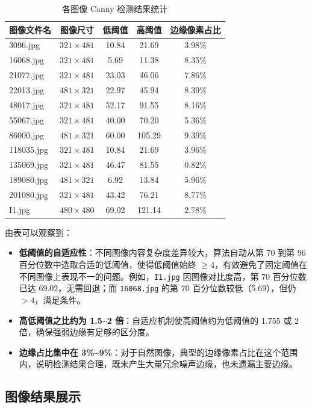 \documentclass[12pt,a4paper]{ctexart}
\begin{document}
\begin{table}[H]
\centering
\caption{各图像 Canny 检测结果统计}
\label{tab:stats}
\begin{tabular}{lcccc}
\toprule
图像文件名 & 图像尺寸 & 低阈值 & 高阈值 & 边缘像素占比 \\
\midrule
3096.jpg   & $321\times481$ & 10.84 & 21.69 & 3.98\% \\
16068.jpg  & $321\times481$ & 5.69  & 11.38 & 8.35\% \\
21077.jpg  & $321\times481$ & 23.03 & 46.06 & 7.86\% \\
22013.jpg  & $481\times321$ & 22.97 & 45.94 & 8.39\% \\
48017.jpg  & $321\times481$ & 52.17 & 91.55 & 8.16\% \\
55067.jpg  & $321\times481$ & 40.00 & 70.20 & 5.36\% \\
86000.jpg  & $481\times321$ & 60.00 & 105.29 & 9.39\% \\
118035.jpg & $321\times481$ & 10.84 & 21.69 & 3.96\% \\
135069.jpg & $321\times481$ & 46.47 & 81.55 & 0.82\% \\
189080.jpg & $481\times321$ & 6.92  & 13.84 & 5.96\% \\
201080.jpg & $321\times481$ & 43.42 & 76.21 & 8.77\% \\
I1.jpg     & $480\times480$ & 69.02 & 121.14 & 2.78\% \\
\bottomrule
\end{tabular}
\end{table}

由表可以观察到：
\begin{itemize}
  \item \textbf{低阈值的自适应性}：不同图像内容复杂度差异较大，算法自动从第 70 到第 96 百分位数中选取合适的低阈值，使得低阈值始终 $\geq 4$，有效避免了固定阈值在不同图像上表现不一的问题。例如，\texttt{I1.jpg} 因图像对比度高，第 70 百分位数已达 69.02，无需回退；而 \texttt{16068.jpg} 的第 70 百分位数较低（5.69），但仍 $> 4$，满足条件。
  \item \textbf{高低阈值之比约为 1.5--2 倍}：自适应机制使高阈值约为低阈值的 1.755 或 2 倍，确保强弱边缘有足够的区分度。
  \item \textbf{边缘占比集中在 3\%--9\%}：对于自然图像，典型的边缘像素占比在这个范围内，说明检测结果合理，既未产生大量冗余噪声边缘，也未遗漏主要边缘。
\end{itemize}

\subsection{图像结果展示}
\end{document}
